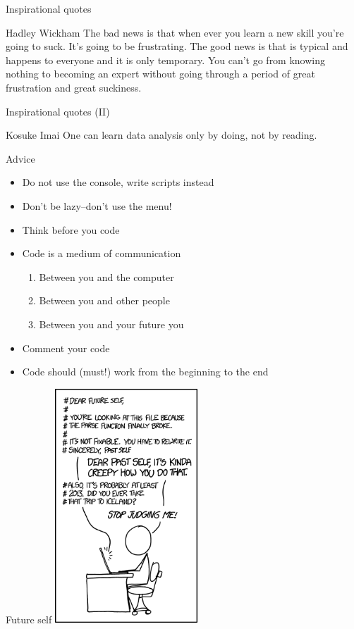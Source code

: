 \documentclass{beamer}
\begin{document}
\begin{frame}{Inspirational quotes}
\begin{block}{Hadley Wickham}
The bad news is that when ever you learn a new skill you’re going to suck. It's going to be frustrating. The good news is that is typical and happens to everyone and it is only temporary. You can’t go from knowing nothing to becoming an expert without going through a period of great frustration and great suckiness.
   \end{block} 
\end{frame}

\begin{frame}{Inspirational quotes (II)}
\begin{block}{Kosuke Imai}
One can learn data analysis only by doing, not by reading.
   \end{block} 
\end{frame}


\begin{frame}{Advice}
\begin{itemize}[<+->]
\item Do not use the console, write scripts instead
\item Don't be lazy--don't use the menu!
\item Think before you code
  \item Code is a medium of communication
  \begin{enumerate}
    \item Between you and the computer
    \item Between you and other people
    \item Between you and your future you
 \end{enumerate}
 \item Comment your code
 \item Code should (must!) work from the beginning to the end
   \end{itemize} 
\end{frame}


 \begin{frame}{Future self}
 \centering
 \includegraphics[width=0.4\textwidth]{../Figures/future_self.png}
 \end{frame}
\end{document}
